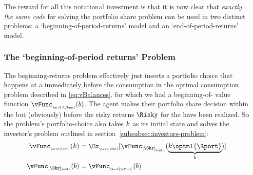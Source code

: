 \documentclass[SolvingMicroDSOPs]{subfiles}
\begin{document}

The reward for all this notational investment is that it is now clear that \emph{exactly the same code} for solving the portfolio share problem can be used in two distinct problems: a `beginning-of-period-returns' model and an `end-of-period-returns' model.

\hypertarget{beginning-returns}{}
\subsubsection{The `beginning-of-period returns' Problem}\label{subsubsec:beginning-returns}
The beginning-returns problem effectively just inserts a portfolio choice that happens at a {\stg} immediately before the consumption {\stg} in the optimal consumption problem described in \eqref{eq:vBalances}, for which we had a beginning-of-{\stg} value function $\vFunc_{_\arvl[\cFunc]}(\bNrm)$.  The agent makes their portfolio share decision within the {\stg} but (obviously) before the risky returns $\Risky$ for the {\interval} have been realized.  So the problem's portfolio-choice {\stg} also takes $k$ as its initial state and solves the investor's problem outlined in section~\ref{subsubsec:investors-problem}:
\begin{equation}\begin{gathered}\begin{aligned}
  \vFunc_{_\arvl[\Shr]}(\kNrm) & = \Ex_{_\arvl[\Shr]}[\vFunc_{[\Shr]_{_\cntn}}(\underbrace{\kNrm\optml{\Rport}}_{\bNrm})]
\\ \vFunc_{[\Shr]_\cntn}(\bNrm)  & = \vFunc_{_\arvl[\cFunc]}(\bNrm)
    \end{aligned}\end{gathered}\end{equation}
\end{document}
